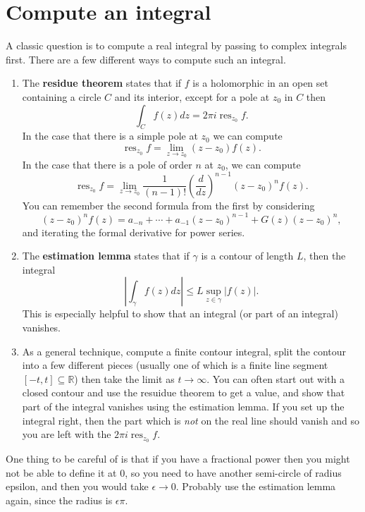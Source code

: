\documentclass[10pt]{article}
\DeclareMathOperator{\res}{res}
\begin{document}
\section{Compute an integral}
A classic question is to compute a real integral by passing to complex integrals first.
There are a few different ways to compute such an integral.

\begin{enumerate}
	\item The \textbf{residue theorem} states that if $f$ is a holomorphic in an open set containing a circle $C$ and its interior, except for a pole at $z_0$ in $C$ then 
	\[ \int_C f(z) dz = 2\pi i \res_{z_0} f.\]
	In the case that there is a simple pole at $z_0$ we can compute
	\[ \res_{z_0} f = \lim_{z \rightarrow z_0} (z-z_0) f(z).\]
	In the case that there is a pole of order $n$ at $z_0$, we can compute
	\[ \res_{z_0} f = \lim_{z \rightarrow z_0} \frac{1}{(n-1)!} \left ( \frac{d}{dz}\right )^{n-1} (z-z_0)^n f(z).\]
	You can remember the second formula from the first by considering \[(z-z_0)^n f(z) = a_{-n} +  \cdots + a_{-1} (z-z_0)^{n-1} + G(z) (z-z_0)^n,\] and iterating the formal derivative for power series.
	
	\item The \textbf{estimation lemma} states that if $\gamma$ is a contour of length $L$, 
	then the integral \[ \left | \int_{\gamma} f(z) dz \right | \leq L \sup_{z \in \gamma} | f(z) |.\]
	This is especially helpful to show that an integral (or part of an integral) vanishes.
	
	\item As a general technique, compute a finite contour integral, split the contour into a few different pieces (usually one of which is a finite line segment $[-t,t] \subseteq \mathbb{R}$) then take the limit as $t \rightarrow \infty$.
	You can often start out with a closed contour and use the resuidue theorem to get a value, and show
	that part of the integral vanishes using the estimation lemma. If you set up the integral right, 
	then the part which is \emph{not} on the real line should vanish and so you are left with 
	the $2\pi i \res_{z_0} f$.
	
\end{enumerate}

One thing to be careful of is that if you have a fractional power then you might not be able to define it at $0$, so you need to have another semi-circle of 
radius epsilon, and then you would take $\epsilon \rightarrow 0$. Probably use the estimation lemma again, since the radius is $\epsilon \pi$.
\end{document}
